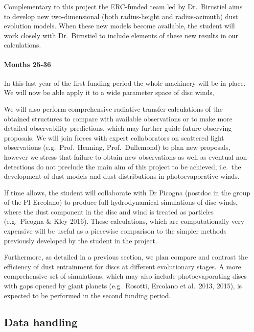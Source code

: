 \documentclass[10pt,fleqn,twoside]{article}
\begin{document}
Complementary to this project the ERC-funded team led by
Dr.\ Birnstiel aims to develop new two-dimensional (both
radius-height and radius-azimuth) dust evolution
models. When these new models become available, the student will work
closely with Dr.\ Birnstiel to include elements of these new results
in our calculations. 

\paragraph{Months 25-36}

In this last year of the first funding period the whole machinery will
be in place. We will now be able apply it to a wide parameter
space of disc winds, 

We will also perform comprehensive radiative transfer calculations of
the obtained structures to compare with available observations or to
make more detailed observability predictions, which may further guide
future observing proposals. We will join forces with expert
collaborators on scattered light observations (e.g.\ Prof.\ Henning,
Prof.\ Dullemond) to
plan new proposals, however we stress that failure to obtain new
observations as well as eventual non-detections do not preclude the
main aim of this project to be achieved, i.e.\ the development
of dust models and dust distributions in photoevaporative winds. 

If time allows, the student will collaborate with Dr Picogna (postdoc
in the group of the PI
Ercolano) to
produce full hydrodynamical simulations of disc winds, where the dust
component in the disc and wind is treated as particles (e.g.\ Picogna
\& Kley 2016). These calculations, which are computationally very expensive
will be useful as a piecewise comparison to the simpler methods previously
developed by the student in the project.  

Furthermore, as detailed in a previous section, we plan compare and contrast
the efficiency of dust entrainment for discs at different evolutionary
stages. A more comprehensive set of simulations, which may also include
photoevaporating discs with gaps opened by giant planets
(e.g.\ Rosotti, Ercolano et al.\ 2013, 2015), is expected to be
performed in the second funding period. 

\vspace{0.5em}


\subsection{Data handling}
\end{document}
